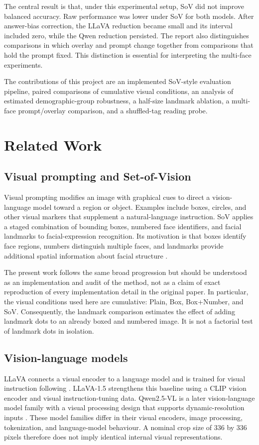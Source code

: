 \documentclass[lettersize,journal]{IEEEtran}
\begin{document}
The central result is that, under this experimental setup, SoV did not improve balanced accuracy. Raw performance was lower under SoV for both models. After answer-bias correction, the LLaVA reduction became small and its interval included zero, while the Qwen reduction persisted. The report also distinguishes comparisons in which overlay and prompt change together from comparisons that hold the prompt fixed. This distinction is essential for interpreting the multi-face experiments.

The contributions of this project are an implemented SoV-style evaluation pipeline, paired comparisons of cumulative visual conditions, an analysis of estimated demographic-group robustness, a half-size landmark ablation, a multi-face prompt/overlay comparison, and a shuffled-tag reading probe.

\section{Related Work}
\subsection{Visual prompting and Set-of-Vision}
Visual prompting modifies an image with graphical cues to direct a vision-language model toward a region or object. Examples include boxes, circles, and other visual markers that supplement a natural-language instruction. SoV applies a staged combination of bounding boxes, numbered face identifiers, and facial landmarks to facial-expression recognition. Its motivation is that boxes identify face regions, numbers distinguish multiple faces, and landmarks provide additional spatial information about facial structure \cite{zhang2024sov}.

The present work follows the same broad progression but should be understood as an implementation and audit of the method, not as a claim of exact reproduction of every implementation detail in the original paper. In particular, the visual conditions used here are cumulative: Plain, Box, Box+Number, and SoV. Consequently, the landmark comparison estimates the effect of adding landmark dots to an already boxed and numbered image. It is not a factorial test of landmark dots in isolation.

\subsection{Vision-language models}
LLaVA connects a visual encoder to a language model and is trained for visual instruction following \cite{liu2023llava,liu2024llava15}. LLaVA-1.5 strengthens this baseline using a CLIP vision encoder and visual instruction-tuning data. Qwen2.5-VL is a later vision-language model family with a visual processing design that supports dynamic-resolution inputs \cite{bai2025qwen25vl}. These model families differ in their visual encoders, image processing, tokenization, and language-model behaviour. A nominal crop size of 336 by 336 pixels therefore does not imply identical internal visual representations.
\end{document}

